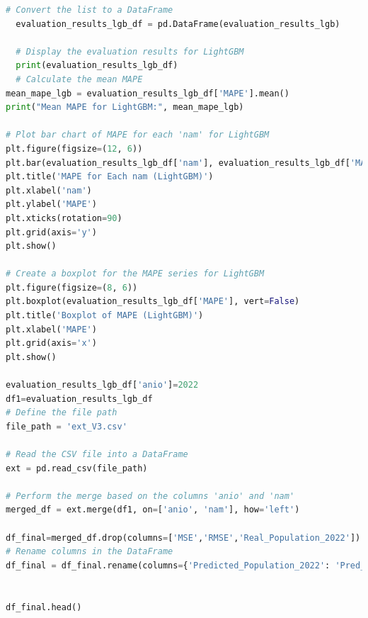 \documentclass{article}
\theoremstyle{mytheoremstyle}
\theoremstyle{mytheoremstyle}
\theoremstyle{myproblemstyle}
\begin{document}
\begin{lstlisting}[language=Python, caption=LightGMB.ipynb,label={lst:LightGBM.ipynb}]
  # Convert the list to a DataFrame
  evaluation_results_lgb_df = pd.DataFrame(evaluation_results_lgb)
  
  # Display the evaluation results for LightGBM
  print(evaluation_results_lgb_df)
  # Calculate the mean MAPE
mean_mape_lgb = evaluation_results_lgb_df['MAPE'].mean()
print("Mean MAPE for LightGBM:", mean_mape_lgb)

# Plot bar chart of MAPE for each 'nam' for LightGBM
plt.figure(figsize=(12, 6))
plt.bar(evaluation_results_lgb_df['nam'], evaluation_results_lgb_df['MAPE'])
plt.title('MAPE for Each nam (LightGBM)')
plt.xlabel('nam')
plt.ylabel('MAPE')
plt.xticks(rotation=90)
plt.grid(axis='y')
plt.show()

# Create a boxplot for the MAPE series for LightGBM
plt.figure(figsize=(8, 6))
plt.boxplot(evaluation_results_lgb_df['MAPE'], vert=False)
plt.title('Boxplot of MAPE (LightGBM)')
plt.xlabel('MAPE')
plt.grid(axis='x')
plt.show()

evaluation_results_lgb_df['anio']=2022
df1=evaluation_results_lgb_df
# Define the file path
file_path = 'ext_V3.csv'

# Read the CSV file into a DataFrame
ext = pd.read_csv(file_path)

# Perform the merge based on the columns 'anio' and 'nam'
merged_df = ext.merge(df1, on=['anio', 'nam'], how='left')

df_final=merged_df.drop(columns=['MSE','RMSE','Real_Population_2022'])
# Rename columns in the DataFrame
df_final = df_final.rename(columns={'Predicted_Population_2022': 'Pred_LGB', 'MAPE': 'MAPE_LGB'})


df_final.head()



\end{lstlisting}
\end{document}
